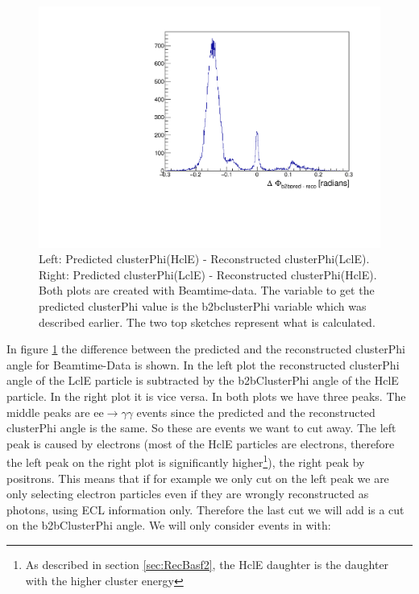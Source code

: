 \documentclass[a4paper,11pt,twosided,final,german,openbib,pdftex,listof=totoc,bibliography=totoc]{scrbook}
\begin{document}
\begin{figure}[h!]
\begin{minipage}[b]{0.45\linewidth}
		\includegraphics[width=\textwidth]{Cuts/Data/b2b_ProbeTag.pdf}
	\end{minipage}
	\caption[b2bClusterPhi - clusterPhi For Beamtime-Data]{Left: Predicted clusterPhi(HclE) - Reconstructed clusterPhi(LclE). Right: Predicted clusterPhi(LclE) - Reconstructed clusterPhi(HclE). Both plots are created with Beamtime-data. The variable to get the predicted clusterPhi value is the b2bclusterPhi variable which was described earlier. The two top sketches represent what is calculated.}
	\label{fig:b2bData}
\end{figure}

In figure \ref{fig:b2bData} the difference between the predicted and the reconstructed clusterPhi angle for Beamtime-Data is shown. In the left plot the reconstructed clusterPhi angle of the LclE particle is subtracted by the b2bClusterPhi angle of the HclE particle. In the right plot it is vice versa. In both plots we have three peaks. The middle peaks are $\textrm{ee} \rightarrow \gamma \gamma$ events since the predicted and the reconstructed clusterPhi angle is the same. So these are events we want to cut away. The left peak is caused by electrons (most of the HclE particles are electrons, therefore the left peak on the right plot is significantly higher\footnote{As described in section \ref{sec:RecBasf2}, the HclE daughter is the daughter with the higher cluster energy}), the right peak by positrons. This means that if for example we only cut on the left peak we are only selecting electron particles even if they are wrongly reconstructed as photons, using ECL information only. 
Therefore the last cut we will add is a cut on the b2bClusterPhi angle. We will only consider events in with:
\end{document}
